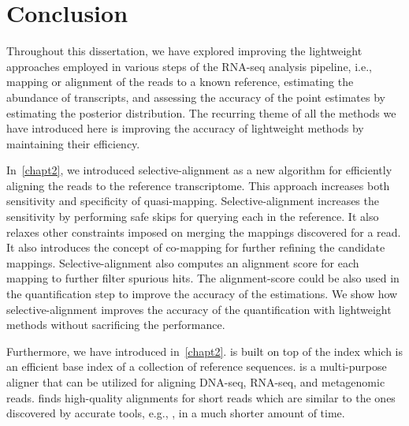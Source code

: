 
\renewcommand{\thechapter}{5}

\chapter[Conclusion]{Conclusion} 
\label{conclusion}

Throughout this dissertation, we have explored improving the lightweight approaches
employed in various steps of the RNA-seq analysis pipeline, i.e., mapping or alignment
of the reads to a known reference, estimating the abundance of transcripts, and 
assessing the accuracy of the point estimates by estimating the posterior distribution.
The recurring theme of all the methods we have introduced here is improving the accuracy
of lightweight methods by maintaining their efficiency.

In~\cref{chapt2}, we introduced selective-alignment as a new algorithm for efficiently
aligning the reads to the reference transcriptome. This approach increases both sensitivity
and specificity of quasi-mapping. Selective-alignment increases the sensitivity by performing
safe skips for querying each \kmer in the reference. It also relaxes other constraints
imposed on merging the mappings discovered for a read. It also introduces the concept of
co-mapping for further refining the candidate mappings. Selective-alignment also computes
an alignment score for each mapping to further filter spurious hits. The alignment-score
could be also used in the quantification step to improve the accuracy of the estimations.
We show how selective-alignment improves the accuracy of the quantification with lightweight
methods without sacrificing the performance.

Furthermore, we have introduced \puffaligner in~\cref{chapt2}. \puffaligner is built on top
of the \pufferfish index which is an efficient \ccdbg base index of a collection of reference
sequences. \puffaligner is a multi-purpose aligner that can be utilized for aligning DNA-seq, 
RNA-seq, and metagenomic reads. \puffaligner finds high-quality alignments for short reads 
which are similar to the ones discovered by accurate tools, e.g., \bt, in a much shorter amount
of time.

